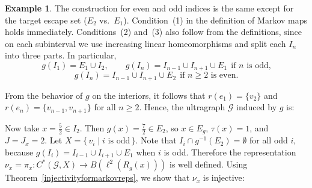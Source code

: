 \documentclass[12pt, reqno]{amsart}
\theoremstyle{definition}
\newtheorem{example}[theorem]{Example}
\theoremstyle{remark}
\numberwithin{equation}{section}
\begin{document}
\begin{example}
The construction for even and odd indices is the same except for the target
escape set ($E_2$ vs.\ $E_1$). Condition~(1) in the definition of Markov maps
holds immediately. Conditions~(2) and~(3) also follow from the definitions,
since on each subinterval we use increasing linear homeomorphisms and split
each $I_n$ into three parts. In particular,
\[
g(I_1)=E_1\cup I_2,\qquad
g(I_n)=I_{n-1}\cup I_{n+1}\cup E_1\ \ \text{if $n$ is odd,}
\]
\[
g(I_n)=I_{n-1}\cup I_{n+1}\cup E_2\ \ \text{if $n\ge 2$ is even.}
\]

From the behavior of $g$ on the interiors, it follows that
$r(e_1)=\{v_2\}$ and $r(e_n)=\{v_{n-1},v_{n+1}\}$ for all $n\ge 2$.
Hence, the ultragraph $\mathcal{G}$ induced by $g$ is:
\begin{center}
\end{center}

Now take $x=\tfrac{5}{2}\in I_2$. Then $g(x)=\tfrac{7}{2}\in E_2$, so
$x\in E_g$, $\tau(x)=1$, and $J=J_x=2$. Let $X=\{\,v_i \mid i \text{ is odd}\,\}$.
Note that $I_i\cap g^{-1}(E_2)=\emptyset$ for all odd $i$, because
$g(I_i)=I_{i-1}\cup I_{i+1}\cup E_1$ when $i$ is odd. Therefore the
representation $\nu_x=\pi_x\colon C^*(\mathcal{G},X)\to B(\ell^2(R_g(x)))$
is well defined. Using Theorem~\ref{injectivityformarkovreps}, we show that
$\nu_x$ is injective:


\end{example}
\end{document}
